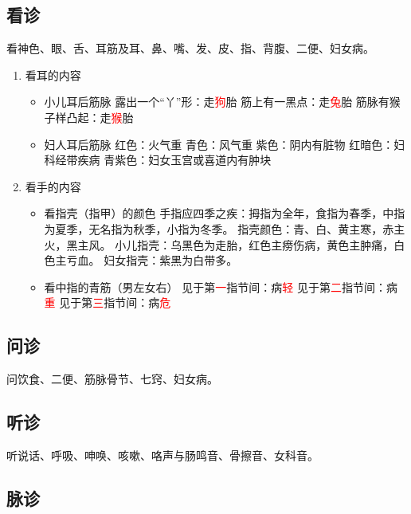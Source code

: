 \documentclass[cn,blue,12pt,normal,founder]{elegantnote}
\newcommand{\redt}[1]{\textcolor{red}{{}#1}}      %
\begin{document}

\subsection{看诊}

看神色、眼、舌、耳筋及耳、鼻、嘴、发、皮、指、背腹、二便、妇女病。

\begin{enumerate}
  \item 看耳的内容
  \begin{itemize}
    \item 小儿耳后筋脉
    \subitem 露出一个“丫”形：走\redt{狗}胎
    \subitem 筋上有一黑点：走\redt{兔}胎
    \subitem 筋脉有猴子样凸起：走\redt{猴}胎
    \item 妇人耳后筋脉
    \subitem 红色：火气重
    \subitem 青色：风气重
    \subitem 紫色：阴内有脏物
    \subitem 红暗色：妇科经带疾病
    \subitem 青紫色：妇女玉宫或喜道内有肿块
  \end{itemize}
  \item 看手的内容
  \begin{itemize}
    \item 看指壳（指甲）的颜色
    \subitem 手指应四季之疾：拇指为全年，食指为春季，中指为夏季，无名指为秋季，小指为冬季。
    \subitem 指壳颜色：青、白、黄主寒，赤主火，黑主风。
    \subitem 小儿指壳：乌黑色为走胎，红色主痨伤病，黄色主肿痛，白色主亏血。
    \subitem 妇女指壳：紫黑为白带多。
    \item 看中指的青筋（男左女右）
    \subitem 见于第\redt{一}指节间：病\redt{轻}
    \subitem 见于第\redt{二}指节间：病\redt{重}
    \subitem 见于第\redt{三}指节间：病\redt{危}
  \end{itemize}
\end{enumerate}

\subsection{问诊}

问饮食、二便、筋脉骨节、七窍、妇女病。

\subsection{听诊}

听说话、呼吸、呻唤、咳嗽、咯声与肠鸣音、骨擦音、女科音。

\subsection{脉诊}
\end{document}
